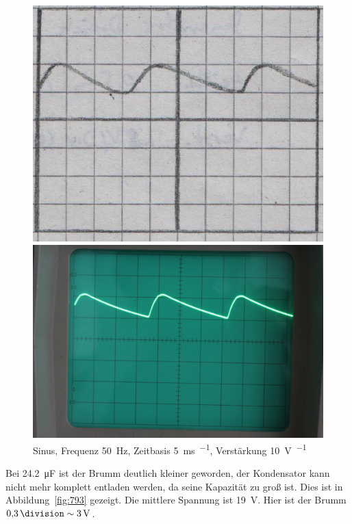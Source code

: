 \begin{figure}[htbp]
	\centering
	\begin{minipage}{.45\linewidth}
	\includegraphics[width=\linewidth]{Oszi_Hand/792.jpg}
	\end{minipage}
	\hfill
	\begin{minipage}{.45\linewidth}
	\includegraphics[width=\linewidth]{Oszi_Foto/792.jpg}
	\end{minipage}
	\caption{%
		Sinus, Frequenz \SI{50}{\hertz},
		Zeitbasis \SI{5}{\milli\second\per\division},
		Verstärkung \SI{10}{\volt\per\division}
	}
	\label{fig:792}
\end{figure}

Bei \SI{24.2}{\micro\farad} ist der Brumm deutlich kleiner geworden, der
Kondensator kann nicht mehr komplett entladen werden, da seine Kapazität zu
groß ist. Dies ist in Abbildung~\ref{fig:793} gezeigt. Die mittlere Spannung
ist \SI{19}{\volt}. Hier ist der Brumm $\SI{0.3}\division \sim \SI{3}\volt$.

